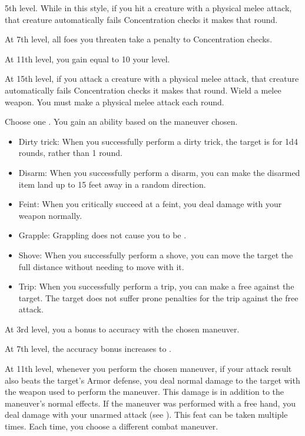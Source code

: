     \featpre 5th level.
    \featben While in this style, if you hit a creature with a physical melee attack, that creature automatically fails Concentration checks it makes that round.

    At 7th level, all foes you threaten take a  penalty to Concentration checks.

    At 11th level, you gain  equal to 10 \add your level.

    At 15th level, if you attack a creature with a physical melee attack, that creature automatically fails Concentration checks it makes that round.
    \stylereq Wield a melee weapon. You must make a physical melee attack each round.

    Choose one .
    \featben You gain an ability based on the maneuver chosen.
    \begin{itemize}
        \item Dirty trick: When you successfully perform a dirty trick, the target is \impaired for 1d4 rounds, rather than 1 round.
        \item Disarm: When you successfully perform a disarm, you can make the disarmed item land up to 15 feet away in a random direction.
        \item Feint: When you critically succeed at a feint, you deal damage with your weapon normally.
        \item Grapple: Grappling does not cause you to be .
        \item Shove: When you successfully perform a shove, you can move the target the full distance without needing to move with it.
        \item Trip: When you successfully perform a trip, you can make a free  against the target. The target does not suffer prone penalties for the trip against the free attack.
    \end{itemize}

    At 3rd level, you a  bonus to accuracy with the chosen maneuver.

    At 7th level, the accuracy bonus increases to .

    At 11th level, whenever you perform the chosen maneuver, if your attack result also beats the target's Armor defense, you deal normal damage to the target with the weapon used to perform the maneuver.
    This damage is in addition to the maneuver's normal effects.
    If the maneuver was performed with a free hand, you deal damage with your unarmed attack (see ).
     This feat can be taken multiple times.
    Each time, you choose a different combat maneuver.

